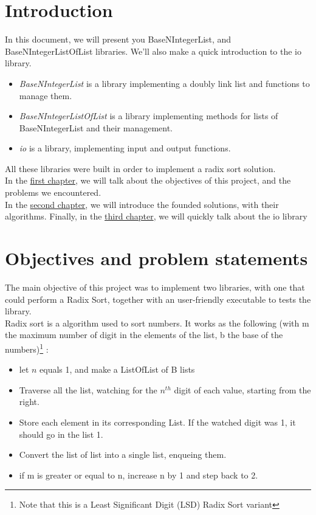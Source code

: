 \documentclass[book, backcover, english, nodocumentinfo]{upmethodology-document}
\begin{document}
\chapter*{Introduction}
In this document, we will present you BaseNIntegerList, and BaseNIntegerListOfList libraries. We'll also make a quick introduction to the io library.\\
\begin{itemize}
	\item{}   \textit{BaseNIntegerList} is a library implementing a doubly link list and functions to manage them.\\
	\item{}   \textit{BaseNIntegerListOfList} is a library implementing methods for lists of BaseNIntegerList and their management.\\
	\item{}   \textit{io} is a library, implementing input and output functions.\\
\end{itemize}

All these libraries were built in order to implement a radix sort solution.\\

In the \hyperref[chapter:Objectives]{first chapter}, we will talk about the objectives of this project, and the problems we encountered.\\
In the \hyperref[chapter:Algorithms]{second chapter}, we will introduce the founded solutions, with their algorithms.
Finally, in the \hyperref[chapter:IO-Lib]{third chapter}, we will quickly talk about  the io library

\tableofcontents{}

\chapter{Objectives and problem statements} \label{chapter:Objectives}
The main objective of this project was to implement two libraries, with one that could perform a Radix Sort, together with an user-friendly executable to tests the library.\\
Radix sort is a algorithm used to sort numbers. It works as the following (with m the maximum number of digit in the elements of the list, b the base of the numbers)\footnote{Note that this is a Least Significant Digit (LSD) Radix Sort variant} :\\
\begin{itemize}
	\item[1]{} let \(n\) equals 1, and make a ListOfList of B lists
	\item[2]{} Traverse all the list, watching for the \(n^{th}\) digit of each value, starting from the right.
	\item[3]{} Store each element in its corresponding List. If the watched digit was 1, it should go in the  list 1.
	\item[4]{} Convert the list of list into a single list, enqueing them.
	\item[5]{} if m is greater or equal to n, increase n by 1 and step back to 2.
\end{itemize}
\end{document}
